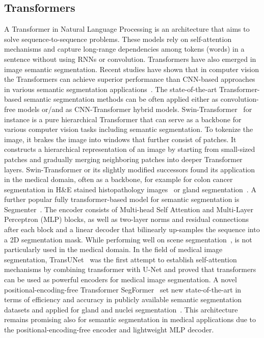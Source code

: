 \subsection{Transformers}
A Transformer in  Natural Language Processing is an architecture that aims to solve
sequence-to-sequence problems.
These models rely on self-attention mechanisms and capture long-range dependencies among tokens
(words) in a sentence without using RNNs or convolution. Transformers have also emerged in image
semantic segmentation. Recent studies have shown that in computer vision the Transformers can
achieve superior performance than CNN-based approaches in various semantic segmentation applications~\cite{nguyen2022evaluating}.
The state-of-the-art Transformer-based semantic segmentation methods can be often applied either as
convolution-free models or/and as CNN-Transformer hybrid models. Swin-Transformer~\cite{liu2021swin}
for instance is a pure hierarchical Transformer that can serve as a  backbone for various computer
vision tasks including semantic segmentation. To tokenize the image, it brakes the image into windows
that further consist of patches. It constructs a hierarchical representation of an image by starting
from small-sized patches and gradually merging neighboring patches into deeper Transformer layers.
Swin-Transformer or its slightly modified successors found its application in the medical domain,
often as a backbone, for example for colon cancer segmentation in H\&E stained histopathology
images~\cite{qian2022transformer} or gland segmentation~\cite{lin2022ds}. A further popular fully
transformer-based model for semantic segmentation is Segmenter~\cite{strudel2021segmenter}.
The encoder consists of Multi-head Self Attention and Multi-Layer Perceptron (MLP) blocks, as well
as two-layer norms and residual connections after each block and a linear decoder that bilinearly
up-samples the sequence into a 2D segmentation mask. While performing well on scene
segmentation~\cite{strudel2021segmenter}, is not particularly used in the medical domain.
In the field of medical image segmentation, TransUNet~\cite{chen2021transunet} was the first attempt
to establish self-attention mechanisms by combining transformer with U-Net and proved that
transformers can be used as powerful encoders for medical image segmentation.
A novel positional-encoding-free Transformer SegFormer~\cite{xie2021segformer}
set new state-of-the-art in terms of efficiency and accuracy in publicly available semantic segmentation
datasets and applied for gland and nuclei segmentation~\cite{lin2022ds}.
This architecture remains promising also for semantic segmentation in medical
applications due to the positional-encoding-free encoder and lightweight MLP decoder.

